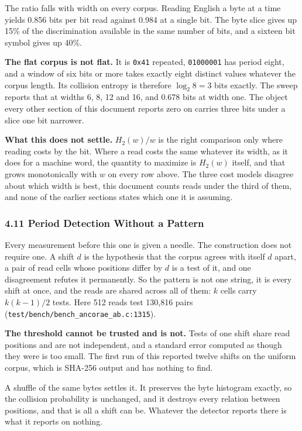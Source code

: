 The ratio falls with width on every corpus. Reading English a byte at a time yields 0.856 bits per bit read against 0.984 at a single bit. The byte slice gives up 15\% of the discrimination available in the same number of bits, and a sixteen bit symbol gives up 40\%.

\noindent\textbf{The flat corpus is not flat.} It is \texttt{0x41} repeated, \texttt{01000001} has period eight, and a window of six bits or more takes exactly eight distinct values whatever the corpus length. Its collision entropy is therefore \(\log_2 8 = 3\) bits exactly. The sweep reports that at widths 6, 8, 12 and 16, and 0.678 bits at width one. The object every other section of this document reports zero on carries three bits under a slice one bit narrower.

\noindent\textbf{What this does not settle.} \(H_2(w)/w\) is the right comparison only where reading costs by the bit. Where a read costs the same whatever its width, as it does for a machine word, the quantity to maximize is \(H_2(w)\) itself, and that grows monotonically with \(w\) on every row above. The three cost models disagree about which width is best, this document counts reads under the third of them, and none of the earlier sections states which one it is assuming.

\subsubsection{4.11 Period Detection Without a Pattern}

Every measurement before this one is given a needle. The construction does not require one. A shift \(d\) is the hypothesis that the corpus agrees with itself \(d\) apart, a pair of read cells whose positions differ by \(d\) is a test of it, and one disagreement refutes it permanently. So the pattern is not one string, it is every shift at once, and the reads are shared across all of them: \(k\) cells carry \(k(k-1)/2\) tests. Here 512 reads test 130,816 pairs (\texttt{test/\allowbreak{}bench/\allowbreak{}bench\_\allowbreak{}ancorae\_\allowbreak{}ab.\allowbreak{}c:1315}).

\noindent\textbf{The threshold cannot be trusted and is not.} Tests of one shift share read positions and are not independent, and a standard error computed as though they were is too small. The first run of this reported twelve shifts on the uniform corpus, which is SHA-256 output and has nothing to find.

A shuffle of the same bytes settles it. It preserves the byte histogram exactly, so the collision probability is unchanged, and it destroys every relation between positions, and that is all a shift can be. Whatever the detector reports there is what it reports on nothing.

